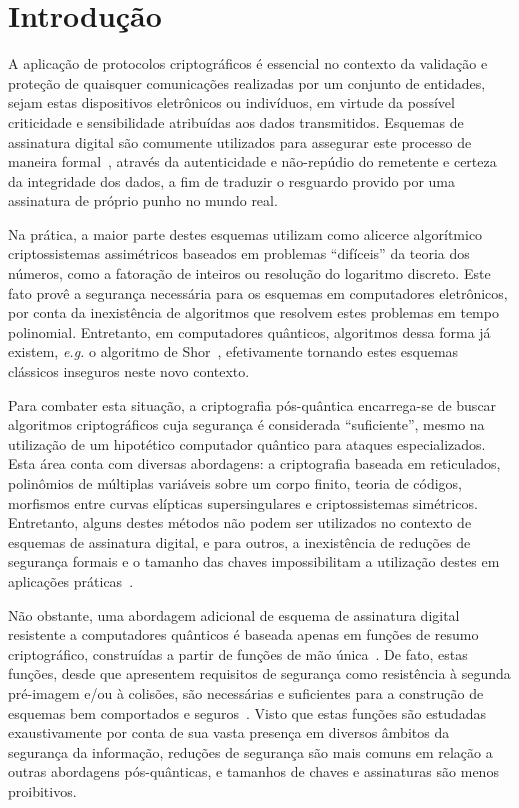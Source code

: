 \documentclass{ufsctex/ufsctex}
\begin{document}
\capa{}
\pretextuais{}
\listadefiguras{}
\listadetabelas{}
\listadeabreviaturas{}
\listadesimbolos{}
\listadealgoritmos{}
\sumario{}

\chapter{Introdução}\label{chapter:intro}

A aplicação de protocolos criptográficos é essencial no contexto da validação e
proteção de quaisquer comunicações realizadas por um conjunto de entidades,
sejam estas dispositivos eletrônicos ou indivíduos, em virtude da possível
criticidade e sensibilidade atribuídas aos dados transmitidos. Esquemas de
assinatura digital são comumente utilizados para assegurar este processo de
maneira formal~\cite[Seção 6.1]{Goldreich:book:2004}, através da autenticidade
e não-repúdio do remetente e certeza da integridade dos dados, a fim de
traduzir o resguardo provido por uma assinatura de próprio punho no mundo real.

Na prática, a maior parte destes esquemas utilizam como alicerce algorítmico
criptossistemas assimétricos baseados em problemas ``difíceis'' da teoria dos
números, como a fatoração de inteiros ou resolução do logaritmo discreto. Este
fato provê a segurança necessária para os esquemas em computadores eletrônicos,
por conta da inexistência de algoritmos que resolvem estes problemas em tempo
polinomial. Entretanto, em computadores quânticos, algoritmos dessa forma já
existem, \emph{e.g.} o algoritmo de Shor~\cite{Shor:article:1997:oct},
efetivamente tornando estes esquemas clássicos inseguros neste novo contexto.

Para combater esta situação, a criptografia pós-quântica encarrega-se de buscar
algoritmos criptográficos cuja segurança é considerada ``suficiente'', mesmo na
utilização de um hipotético computador quântico para ataques especializados.
Esta área conta com diversas abordagens: a criptografia baseada em reticulados,
polinômios de múltiplas variáveis sobre um corpo finito, teoria de códigos,
morfismos entre curvas elípticas supersingulares e criptossistemas simétricos.
Entretanto, alguns destes métodos não podem ser utilizados no contexto de
esquemas de assinatura digital, e para outros, a inexistência de reduções de
segurança formais e o tamanho das chaves impossibilitam a utilização destes em
aplicações práticas~\cite{Bernstein:article:2017:sep}.

Não obstante, uma abordagem adicional de esquema de assinatura digital
resistente a computadores quânticos é baseada apenas em funções de resumo
criptográfico, construídas a partir de funções de mão
única~\cite{Katz:misc:2005:sep}. De fato, estas funções, desde que apresentem
requisitos de segurança como resistência à segunda pré-imagem e/ou à colisões,
são necessárias e suficientes para a construção de esquemas bem comportados e
seguros~\cite{Rompel:inproc:1990:may}. Visto que estas funções são estudadas
exaustivamente por conta de sua vasta presença em diversos âmbitos da segurança
da informação, reduções de segurança são mais comuns em relação a outras
abordagens pós-quânticas, e tamanhos de chaves e assinaturas são menos
proibitivos.
\end{document}
